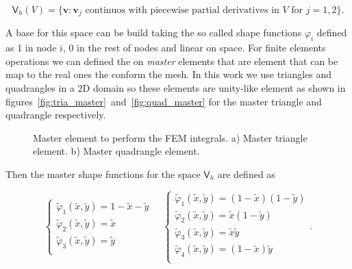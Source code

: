 \documentclass[review]{elsarticle}
\begin{document}
\begin{equation}
\bm{\mathsf{V}}_h(V) = \{ 
  \bm{v} : \bm{v}_j \text{ continuos with piecewise partial derivatives in } V
  \text{ for } j=1,2
\}.
\end{equation}

A base for this space can be build taking the so called shape functions
$\varphi_i$ defined as 1 in node $i$, 0 in the rest of nodes and linear on
space. For finite elements operations we can defined the on \emph{master}
elements that are element that can be map to the real ones the conform the mesh.
In this work we use triangles and quadrangles in a 2D domain so these elements
are unity-like element as shown in
figures~\ref{fig:tria_master}~and~\ref{fig:quad_master} for the master triangle
and quadrangle respectively.


\begin{figure}[!ht]
\begin{minipage}[b]{0.4\linewidth}
\subcaptionbox{\label{fig:tria_master}}{
\resizebox{4.0cm}{!}{}}
\end{minipage}
\hspace{1.5cm}
\begin{minipage}[b]{0.4\linewidth}
\subcaptionbox{\label{fig:quad_master}}{
\resizebox{4.0cm}{!}{}}
\end{minipage}
\caption{Master element to perform the FEM integrals.
a) Master triangle element. 
b) Master quadrangle element.
}
\label{fig_dist_scheme}
\end{figure}


Then the master shape functions for the space $\bm{\mathsf{V}}_h$ are defined as

\begin{equation}
\left\{
\begin{array}{ll}
\tilde{\varphi}_1(\tilde{x},\tilde{y}) = 1 - \tilde{x} - \tilde{y}\\
\tilde{\varphi}_2(\tilde{x},\tilde{y}) = \tilde{x}\\
\tilde{\varphi}_3(\tilde{x},\tilde{y}) = \tilde{y}\\
\end{array}
\right.
\quad
\left\{
\begin{array}{ll}
\tilde{\varphi}_1(\tilde{x},\tilde{y}) = (1 - \tilde{x})(1 - \tilde{y})\\
\tilde{\varphi}_2(\tilde{x},\tilde{y}) = \tilde{x}(1 - \tilde{y})\\
\tilde{\varphi}_3(\tilde{x},\tilde{y}) = \tilde{x}\tilde{y}\\
\tilde{\varphi}_4(\tilde{x},\tilde{y}) = (1 - \tilde{x})\tilde{y}\\
\end{array}
\right.
.
\end{equation}
\end{document}
